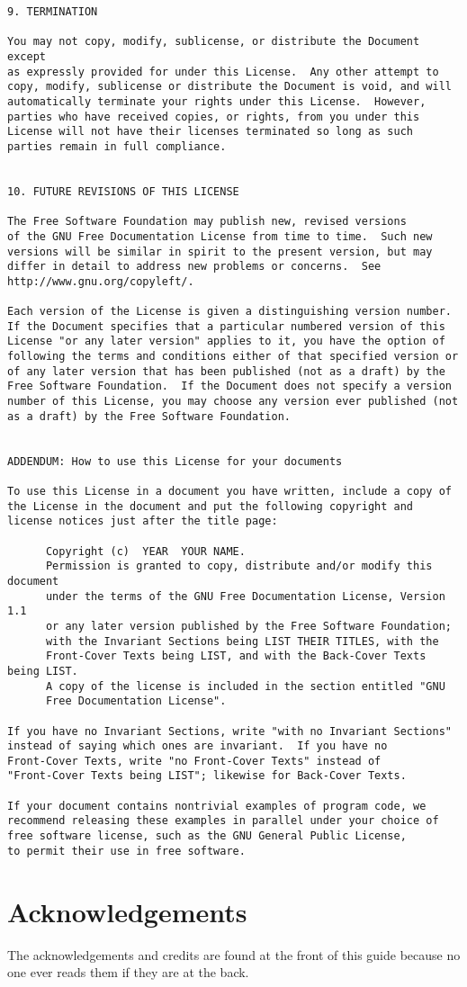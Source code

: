 \documentclass{report}
\begin{document}
\begin{verbatim}
9. TERMINATION

You may not copy, modify, sublicense, or distribute the Document except
as expressly provided for under this License.  Any other attempt to
copy, modify, sublicense or distribute the Document is void, and will
automatically terminate your rights under this License.  However,
parties who have received copies, or rights, from you under this
License will not have their licenses terminated so long as such
parties remain in full compliance.


10. FUTURE REVISIONS OF THIS LICENSE

The Free Software Foundation may publish new, revised versions
of the GNU Free Documentation License from time to time.  Such new
versions will be similar in spirit to the present version, but may
differ in detail to address new problems or concerns.  See
http://www.gnu.org/copyleft/.

Each version of the License is given a distinguishing version number.
If the Document specifies that a particular numbered version of this
License "or any later version" applies to it, you have the option of
following the terms and conditions either of that specified version or
of any later version that has been published (not as a draft) by the
Free Software Foundation.  If the Document does not specify a version
number of this License, you may choose any version ever published (not
as a draft) by the Free Software Foundation.


ADDENDUM: How to use this License for your documents

To use this License in a document you have written, include a copy of
the License in the document and put the following copyright and
license notices just after the title page:

      Copyright (c)  YEAR  YOUR NAME.
      Permission is granted to copy, distribute and/or modify this document
      under the terms of the GNU Free Documentation License, Version 1.1
      or any later version published by the Free Software Foundation;
      with the Invariant Sections being LIST THEIR TITLES, with the
      Front-Cover Texts being LIST, and with the Back-Cover Texts being LIST.
      A copy of the license is included in the section entitled "GNU
      Free Documentation License".

If you have no Invariant Sections, write "with no Invariant Sections"
instead of saying which ones are invariant.  If you have no
Front-Cover Texts, write "no Front-Cover Texts" instead of
"Front-Cover Texts being LIST"; likewise for Back-Cover Texts.

If your document contains nontrivial examples of program code, we
recommend releasing these examples in parallel under your choice of
free software license, such as the GNU General Public License,
to permit their use in free software.
\end{verbatim}

\chapter{Acknowledgements}

The acknowledgements and credits are found at the front of this guide
because no one ever reads them if they are at the back.
\end{document}
